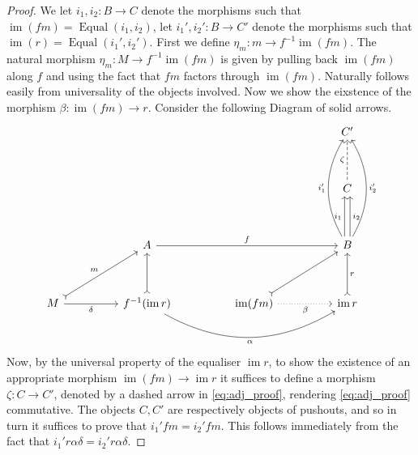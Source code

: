 \documentclass{birkjour}
\theoremstyle{plain}
\theoremstyle{definition}
\newcommand{\lto}{\longrightarrow}
\begin{document}
\begin{proof}
		We let $i_1,i_2: B \lto C$ denote the morphisms such that $\operatorname{im}(fm) = \operatorname{Equal}(i_1,i_2)$, let $i_1',i_2': B \lto C'$ denote the morphisms such that $\operatorname{im}(r) = \operatorname{Equal}(i_1',i_2')$. First we define $\eta_m: m \lto f^{-1}\operatorname{im}(fm)$. The natural morphism $\eta_m: M \lto f^{-1}\operatorname{im}(fm)$ is given by pulling back $\operatorname{im}(fm)$ along $f$ and using the fact that $fm$ factors through $\operatorname{im}(fm)$. Naturally follows easily from universality of the objects involved. Now we show the eixstence of the morphism $\beta: \operatorname{im}(fm) \lto r$. Consider the following Diagram of solid arrows.
		\begin{equation}\label{eq:adj_proof}
			\begin{tikzcd}[column sep = huge, row sep = huge]
				&&& C'\\
				&&& C\arrow[u,dashed,"{\zeta}"] \\
				&A\arrow[rr,"{f}"] && B\arrow[u,shift left,"{i_1}"]\arrow[u,shift right, swap,"{i_2}"]\arrow[uu,bend left, "{i_1'}"]\arrow[uu,bend right,swap,"{i_2'}"]\\
				M\arrow[ur,rightarrowtail,"{m}"]\arrow[r,swap,"{\delta}"] & f^{-1}(\operatorname{im}r)\arrow[u,rightarrowtail]\arrow[rr,bend right,swap,"{\alpha}"] & \operatorname{im}(fm)\arrow[ur,rightarrowtail]\arrow[r,dotted,swap,"{\beta}"] & \operatorname{im}r\arrow[u,rightarrowtail,swap,"{r}"]
			\end{tikzcd}
		\end{equation}
		Now, by the universal property of the equaliser $\operatorname{im}r$, to show the existence of an appropriate morphism $\operatorname{im}(fm) \lto \operatorname{im}r$ it suffices to define a morphism $\zeta: C \lto C'$, denoted by a dashed arrow in \eqref{eq:adj_proof}, rendering \eqref{eq:adj_proof} commutative. The objects $C,C'$ are respectively objects of pushouts, and so in turn it suffices to prove that $i_1' f m = i_2' f m$. This follows immediately from the fact that $i_1' r \alpha \delta = i_2' r \alpha \delta$.
		
		
	\end{proof}
	
\end{document}
